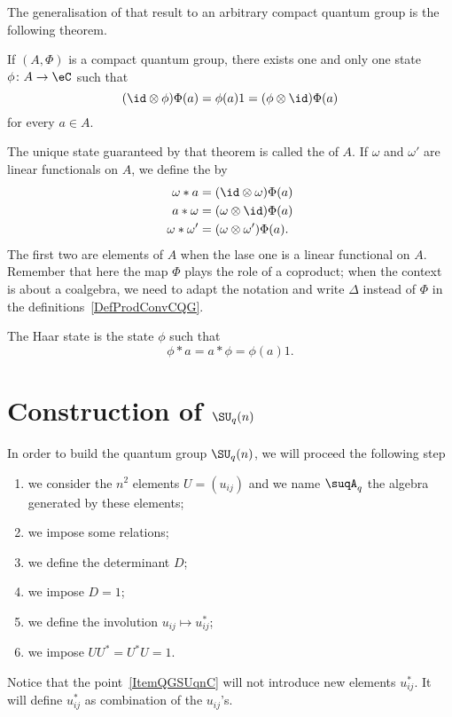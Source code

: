 The generalisation of that result to an arbitrary compact quantum group is the following theorem.
\begin{theorem}
	If $(A,\Phi)$ is a compact quantum group, there exists one and only one state $\phi\colon A\to \eC$ such that
	\begin{equation}
		(\id\otimes\phi)\Phi(a)=\phi(a)1=(\phi\otimes\id)\Phi(a)
	\end{equation}
	for every $a\in A$.
\end{theorem}
The unique state guaranteed by that theorem is called the  of $A$. If $\omega$ and $\omega'$ are linear functionals on $A$, we define the  by
\begin{equation}        \label{DefProdConvCQG}
	\begin{aligned}[]
		\omega * a       & =(\id\otimes\omega)\Phi(a)      \\
		a*\omega         & =(\omega\otimes\id)\Phi(a)      \\
		\omega * \omega' & =(\omega\otimes\omega')\Phi(a).
	\end{aligned}
\end{equation}
The first two are elements of $A$ when the lase one is a linear functional on $A$. Remember that here the map $\Phi$ plays the role of a coproduct; when the context is about a coalgebra, we need to adapt the notation and write $\Delta$ instead of $\Phi$ in the definitions~\ref{DefProdConvCQG}.

The Haar state is the state $\phi$ such that
\begin{equation}
	\phi*a=a*\phi=\phi(a)1.
\end{equation}


\section{Construction of \texorpdfstring{$\SU_q(n)$}{SUqn}}
\label{SecGeneratorsonSUQn}

In order to build the quantum group $\SU_q(n)$, we will proceed the following step\cite{Koelink}
\begin{enumerate}
	\item
	      we consider the $n^2$ elements $U=(u_{ij})$ and we name $\suqA_q$ the algebra generated by these elements;
	\item
	      we impose some relations;
	\item
	      we define the determinant $D$;
	\item
	      we impose $D=1$;
	      \item\label{ItemQGSUqnC}
	      we define the involution $u_{ij}\mapsto u_{ij}^*$;
	\item
	      we impose $UU^*=U^*U=1$.

\end{enumerate}
Notice that the point~\ref{ItemQGSUqnC} will not introduce new elements $u_{ij}^*$. It will define $u_{ij}^*$ as combination of the $u_{ij}$'s.

